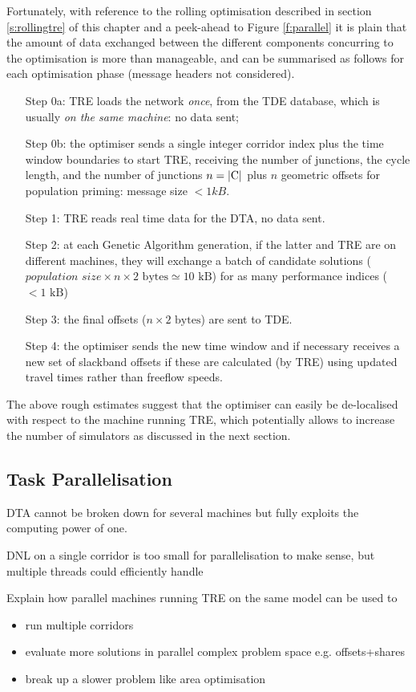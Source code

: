 Fortunately, with reference to the rolling optimisation described in section \ref{s:rollingtre} of this chapter and a peek-ahead to Figure \ref{f:parallel} it is plain that the amount of data exchanged between the different components concurring to the optimisation is more than manageable, and can be summarised as follows for each optimisation phase (message headers not considered).
\begin{itemize}
\item[Step 0a:] TRE loads the network \emph{once}, from the TDE database, which is usually \emph{on the same machine}: no data sent;
\item[Step 0b:] the optimiser sends a single integer corridor index plus the time window boundaries to start TRE, receiving the number of junctions, the cycle length, and the number of junctions $n = |\mathrm{C}|$ plus $n$ geometric offsets for population priming: message size $ < 1 kB$.
\item[Step 1:] TRE reads real time data for the DTA, no data sent.
\item[Step 2:] at each Genetic Algorithm generation, if the latter and TRE are on different machines, they will exchange a batch of candidate solutions ($\textit{population size} \times n \times 2 \text{ bytes} \simeq 10 \text{ kB}$) for as many performance indices ($< 1 \text{ kB}$)
\item[Step 3:] the final offsets ($n \times 2 \text{ bytes}$) are sent to TDE.
\item[Step 4:] the optimiser sends the new time window and if necessary receives a new set of slackband offsets if these are calculated (by TRE) using updated travel times rather than freeflow speeds. 
\end{itemize}
The above rough estimates suggest that the optimiser can easily be de-localised with respect to the machine running TRE, which potentially allows to increase the number of simulators as discussed in the next section.

\subsection{Task Parallelisation}
DTA cannot be broken down for several machines but fully exploits the computing power of one.

DNL on a single corridor is too small for parallelisation to make sense, but multiple threads could efficiently handle 


Explain how parallel machines running TRE on the same model can be used to
\begin{itemize}
\item run multiple corridors
\item evaluate more solutions in parallel complex problem space e.g. offsets+shares
\item break up a slower problem like area optimisation
\end{itemize}

